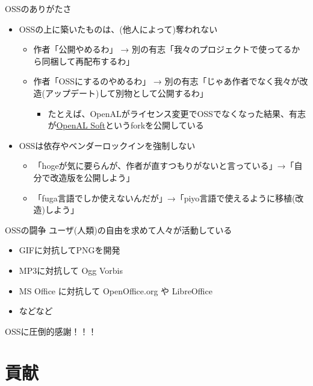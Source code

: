 \documentclass[
        unicode%
    ]{beamer}
\begin{document}
\begin{frame}{OSSのありがたさ}
    \begin{itemize}
        \pause
        \item OSSの上に築いたものは、(他人によって)奪われない
            \begin{itemize}
                \pause
                \item 作者「公開やめるわ」 → 別の有志「我々のプロジェクトで使ってるから同梱して再配布するわ」
                \pause
                \item 作者「OSSにするのやめるわ」 → 別の有志「じゃあ作者でなく我々が改造(アップデート)して別物として公開するわ」
                    \begin{itemize}
                        \item たとえば、OpenALがライセンス変更でOSSでなくなった結果、有志が\href{https://github.com/kcat/openal-soft}{OpenAL Soft}というforkを公開している
                    \end{itemize}
            \end{itemize}
        \pause
        \item OSSは依存やベンダーロックインを強制しない
            \pause
            \begin{itemize}
                \item 「hogeが気に要らんが、作者が直すつもりがないと言っている」→「自分で改造版を公開しよう」
                \item 「fuga言語でしか使えないんだが」→「piyo言語で使えるように移植(改造)しよう」
            \end{itemize}
    \end{itemize}
\end{frame}

\begin{frame}{OSSの闘争}
    ユーザ(人類)の自由を求めて人々が活動している

    \begin{itemize}
        \item GIFに対抗してPNGを開発
        \item MP3に対抗して Ogg Vorbis
        \item MS Office に対抗して OpenOffice.org や LibreOffice
        \item などなど
    \end{itemize}

    OSSに圧倒的感謝！！！
\end{frame}

\section{貢献}
\end{document}
